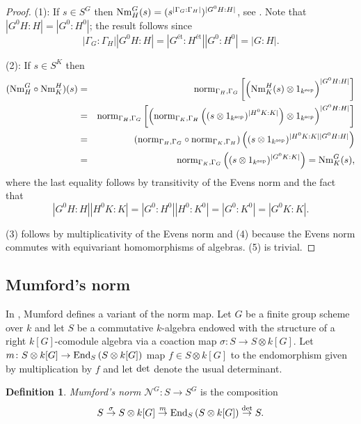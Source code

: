 \documentclass[12pt]{amsart}
\theoremstyle{definition}
\newtheorem{definition}[theorem]{Definition}
\begin{document}
\begin{proof}
	(1): If $s\in S^G$ then ${\rm Nm}_H^G(s)=(s^{|\Gamma_G {:}\Gamma_H|})^{|G^0H{:}H|}$, see \cite[Note on p. 58]{Evens}. Note that $|G^0H{:}H|=|G^0{:}H^0|$; the result follows since
	\[
	|\Gamma_G{:}\Gamma_H||G^0H{:}H|=|G^{\text{\'et}}{:}H^{\text{\'et}}||G^0{:}H^0|=|G{:}H|.
	\]
	
	(2): If $s\in S^K$ then
	\begin{eqnarray*}
		({\rm Nm}_H^G\circ {\rm Nm}_K^H)(s)&=&
		{\rm norm}_{\Gamma_H,\Gamma_G}
		\left[
		\left({\rm Nm}_K^H(s)\otimes 1_{k^{\text{sep}}}\right)^{|G^0H{:}H|}
		\right]
		\\
		&=&
		{\rm norm}_{\Gamma_H,\Gamma_G}
		\left[
		\left({\rm norm}_{\Gamma_K,\Gamma_H}\left((s\otimes 1_{k^{\text{sep}}})^{|H^0K{:}K|}\right)\otimes 1_{k^{\text{sep}}}\right)^{|G^0H{:}H|}
		\right]
		\\
		&=&
		({\rm norm}_{\Gamma_H,\Gamma_G}
		\circ
		{\rm norm}_{\Gamma_K,\Gamma_H})
		\left((s\otimes 1_{k^{\text{sep}}})^{|H^0K{:}K||G^0H{:}H|}\right)
		\\
		&=&
		{\rm norm}_{\Gamma_K,\Gamma_G}\left((s\otimes 1_{k^{\text{sep}}})^{|G^0K{:}K|}\right)
		=
		{\rm Nm}_K^G(s),
	\end{eqnarray*}
	where the last equality follows by transitivity of the Evens norm \cite[6.1.1(N1)]{Evens} and the fact that 
	\[
	|G^0H{:}H||H^0K{:}K|=|G^0{:}H^0||H^0{:}K^0|=|G^0{:}K^0|=|G^0K{:}K|.
	\]
	
	(3) follows by multiplicativity of the Evens norm \cite[6.1.1(N2)]{Evens} and (4) because the Evens norm commutes with equivariant homomorphisms of algebras. (5) is trivial.
\end{proof}






\subsection{Mumford's norm}\label{sec:Mumford}
In \cite[pp.112-113]{MumfordAbelian}, Mumford defines a variant of the norm map. Let $G$ be a finite group scheme over $k$ and let $S$ be a commutative $k$-algebra endowed with the structure of a right $k[G]$-comodule algebra via a coaction map $\sigma \colon S\rightarrow S\otimes k[G]$. Let $m \colon S\otimes k[G]\rightarrow {\rm End}_S\left(S\otimes k[G]\right)$ map $f\in S\otimes k[G]$ to the endomorphism given by multiplication by $f$ and let ${\rm det}$ denote the usual determinant.
\begin{definition}\label{def:Mumfordnorm}
	{\em Mumford's norm} ${\mathcal{N}}^G \colon S\rightarrow S^G$ is the composition
	\[
	S\overset{\sigma}{\rightarrow}S\otimes k[G]\overset{m}{\rightarrow}{\rm End}_S\left(S\otimes k[G]\right)\overset{{\rm det}}{\rightarrow} S.
	\]
\end{definition}
\end{document}
